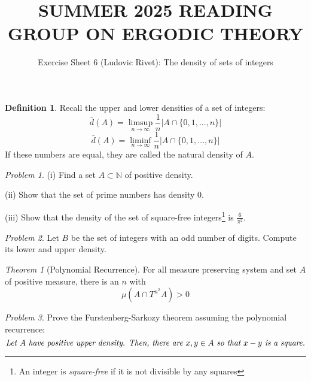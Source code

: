 \documentclass[11pt]{article}
\title{SUMMER 2025 READING GROUP ON ERGODIC THEORY}
\author{Exercise Sheet 6 (Ludovic Rivet): The density of sets of integers}
\date{}
\theoremstyle{definition}
\newtheorem{definition}{Definition}[section]
\theoremstyle{example}
\theoremstyle{remark}
\theoremstyle{lemma}
\theoremstyle{proposition}
\theoremstyle{Problem}
\newtheorem{problem}{Problem}[section]
\theoremstyle{Solution}
\theoremstyle{theorem}
\newtheorem{theorem}{Theorem}[section]
\theoremstyle{corollary}
\begin{document}
\maketitle
\vspace{1cm}

\begin{definition}
Recall the upper and lower densities of a set of integers:
$$\bar{d}(A) = \limsup_{n\to \infty} \frac{1}{n} | A\cap \{0, 1, ..., n\}|$$
$$\bar{d}(A) = \liminf_{n\to \infty} \frac{1}{n} | A\cap \{0, 1, ..., n\}|$$
If these numbers are equal, they are called the natural density of $A$.
\end{definition}

\begin{problem}
(i) Find a set $A\subset \mathbb{N}$ of positive density.

(ii) Show that the set of prime numbers has density $0$.

(iii) Show that the density of the set of square-free integers\footnote{An integer is \textit{square-free} if it is not divisible by any squares} is $\frac{6}{\pi^2}$. 
\end{problem}

\begin{problem}
Let $B$ be the set of integers with an odd number of digits. Compute its lower and upper density.
\end{problem}

\begin{theorem}[Polynomial Recurrence]
For all measure preserving system and set $A$ of positive measure, there is an $n$ with
$$\mu(A\cap T^{n^2}A)>0$$
\end{theorem}

\begin{problem}
Prove the Furstenberg-Sarkozy theorem assuming the polynomial recurrence:
$$\emph{Let $A$ have positive upper density. Then, there are $x,y\in A$ so that $x-y$ is a square.}$$
\end{problem}
\end{document}
